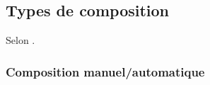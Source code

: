     \subsection{Types de composition}
    \label{sec:types-de-composition}
    Selon \cite{fluegge2006challenges}.
  
    

    


  
      \subsubsection{Composition manuel/automatique}
      \label{sec:comp-manu}
        
